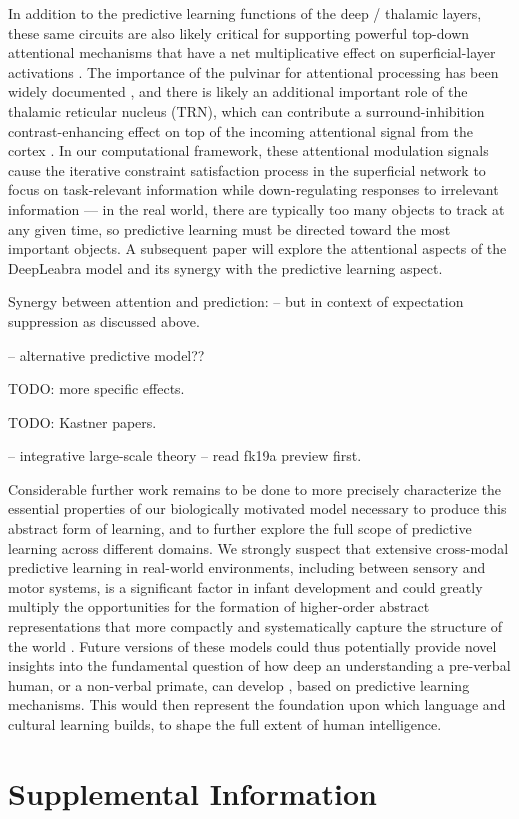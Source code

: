 \documentclass[11pt,twoside]{article}
\newif\myifpdf
\begin{document}
In addition to the predictive learning functions of the deep / thalamic layers, these same circuits are also likely critical for supporting powerful top-down attentional mechanisms that have a net multiplicative effect on superficial-layer activations \cite{BortoneOlsenScanziani14,OlsenBortoneAdesnikEtAl12,BortoneOlsenScanziani14,OlsenBortoneAdesnikEtAl12}. The importance of the pulvinar for attentional processing has been widely documented \cite[e.g.,]{LaBergeBuchsbaum90,BenderYouakim01,SaalmannPinskWangEtAl12}, and there is likely an additional important role of the thalamic reticular nucleus (TRN), which can contribute a surround-inhibition contrast-enhancing effect on top of the incoming attentional signal from the cortex \cite{Crick84,Pinault04,WimmerSchmittDavidsonEtAl15}.  In our computational framework, these attentional modulation signals cause the iterative constraint satisfaction process in the superficial network to focus on task-relevant information while down-regulating responses to irrelevant information --- in the real world, there are typically too many objects to track at any given time, so predictive learning must be directed toward the most important objects. A subsequent paper will explore the attentional aspects of the DeepLeabra model and its synergy with the predictive learning aspect.

Synergy between attention and prediction: \cite{RichterdeLange19} -- but in context of expectation suppression as discussed above.

\cite{KellerMrsic-Flogel18} -- alternative predictive model??

TODO: more specific effects.

TODO: Kastner papers.  \cite{HalassaKastner17}   \cite{FiebelkornPinskKastner18}  \cite{FiebelkornKastner19}

\cite{JaramilloMejiasWang19} -- integrative large-scale theory -- read fk19a preview first.

Considerable further work remains to be done to more precisely characterize the essential properties of our biologically motivated model necessary to produce this abstract form of learning, and to further explore the full scope of predictive learning across different domains.  We strongly suspect that extensive cross-modal predictive learning in real-world environments, including between sensory and motor systems, is a significant factor in infant development and could greatly multiply the opportunities for the formation of higher-order abstract representations that more compactly and systematically capture the structure of the world \cite{YuSmith12}.  Future versions of these models could thus potentially provide novel insights into the fundamental question of how deep an understanding a pre-verbal human, or a non-verbal primate, can develop \cite{SpelkeBreinlingerMacomberEtAl92,ElmanBatesKarmiloff-SmithEtAl96}, based on predictive learning mechanisms.  This would then represent the foundation upon which language and cultural learning builds, to shape the full extent of human intelligence.

\clearpage

\section{Supplemental Information}



\clearpage


\end{document}
